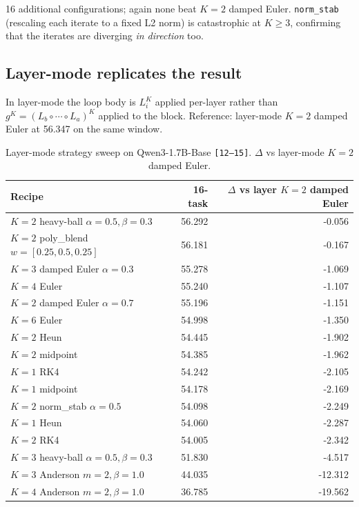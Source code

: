 16 additional configurations; again none beat $K{=}2$ damped Euler. \texttt{norm\_stab} (rescaling each iterate to a fixed L2 norm) is catastrophic at $K \geq 3$, confirming that the iterates are diverging \emph{in direction} too.

\subsection{Layer-mode replicates the result}

In layer-mode the loop body is $L_i^K$ applied per-layer rather than $g^K = (L_b \circ \cdots \circ L_a)^K$ applied to the block. Reference: layer-mode $K{=}2$ damped Euler at 56.347 on the same window.

\begin{table}[h]
\centering
\footnotesize
\caption{Layer-mode strategy sweep on Qwen3-1.7B-Base \texttt{[12--15]}. $\Delta$ vs layer-mode $K{=}2$ damped Euler.}
\label{tab:phase18}
\begin{tabular}{lrr}
\toprule
Recipe & 16-task & $\Delta$ vs layer $K{=}2$ damped Euler \\
\midrule
$K{=}2$ heavy-ball $\alpha{=}0.5,\beta{=}0.3$ & 56.292 & -0.056 \\
$K{=}2$ poly\_blend $w{=}[0.25,0.5,0.25]$    & 56.181 & -0.167 \\
$K{=}3$ damped Euler $\alpha{=}0.3$           & 55.278 & -1.069 \\
$K{=}4$ Euler                                 & 55.240 & -1.107 \\
$K{=}2$ damped Euler $\alpha{=}0.7$           & 55.196 & -1.151 \\
$K{=}6$ Euler                                 & 54.998 & -1.350 \\
$K{=}2$ Heun                                  & 54.445 & -1.902 \\
$K{=}2$ midpoint                              & 54.385 & -1.962 \\
$K{=}1$ RK4                                   & 54.242 & -2.105 \\
$K{=}1$ midpoint                              & 54.178 & -2.169 \\
$K{=}2$ norm\_stab $\alpha{=}0.5$             & 54.098 & -2.249 \\
$K{=}1$ Heun                                  & 54.060 & -2.287 \\
$K{=}2$ RK4                                   & 54.005 & -2.342 \\
$K{=}3$ heavy-ball $\alpha{=}0.5,\beta{=}0.3$ & 51.830 & -4.517 \\
$K{=}3$ Anderson $m{=}2,\beta{=}1.0$          & 44.035 & -12.312 \\
$K{=}4$ Anderson $m{=}2,\beta{=}1.0$          & 36.785 & -19.562 \\
\bottomrule
\end{tabular}
\end{table}

